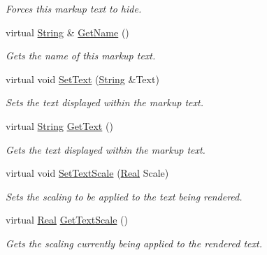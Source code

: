 \begin{DoxyCompactItemize}
\begin{DoxyCompactList}\small\item\em Forces this markup text to hide. \item\end{DoxyCompactList}\item 
virtual \hyperlink{namespacephys_aa03900411993de7fbfec4789bc1d392e}{String} \& \hyperlink{classphys_1_1UI_1_1MarkupText_afa64067f890466ad4844c4836e7667fd}{GetName} ()
\begin{DoxyCompactList}\small\item\em Gets the name of this markup text. \item\end{DoxyCompactList}\item 
virtual void \hyperlink{classphys_1_1UI_1_1MarkupText_af5d9184959b56996e9727e2d7ccf8f22}{SetText} (\hyperlink{namespacephys_aa03900411993de7fbfec4789bc1d392e}{String} \&Text)
\begin{DoxyCompactList}\small\item\em Sets the text displayed within the markup text. \item\end{DoxyCompactList}\item 
virtual \hyperlink{namespacephys_aa03900411993de7fbfec4789bc1d392e}{String} \hyperlink{classphys_1_1UI_1_1MarkupText_af5d8a7e6ca03e15fc488608c28a54c1e}{GetText} ()
\begin{DoxyCompactList}\small\item\em Gets the text displayed within the markup text. \item\end{DoxyCompactList}\item 
virtual void \hyperlink{classphys_1_1UI_1_1MarkupText_ad5840b9cb7235381ce105762008326a6}{SetTextScale} (\hyperlink{namespacephys_af7eb897198d265b8e868f45240230d5f}{Real} Scale)
\begin{DoxyCompactList}\small\item\em Sets the scaling to be applied to the text being rendered. \item\end{DoxyCompactList}\item 
virtual \hyperlink{namespacephys_af7eb897198d265b8e868f45240230d5f}{Real} \hyperlink{classphys_1_1UI_1_1MarkupText_aa69d77428171e0c49c51a5d1854ffaff}{GetTextScale} ()
\begin{DoxyCompactList}\small\item\em Gets the scaling currently being applied to the rendered text. \item\end{DoxyCompactList}\item 

\end{DoxyCompactItemize}
